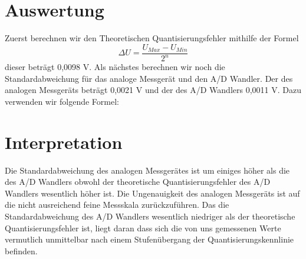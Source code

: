\documentclass[TGAI_Laborbericht.tex]{subfiles}
\begin{document}
\section{Auswertung}
\label{chap:VERSUCH_1_AUSWERTUNG}
Zuerst berechnen wir den Theoretischen Quantisierungsfehler mithilfe der Formel \[\Delta U = \frac{U_{Max}-U_{Min}}{2^{n}} \] dieser beträgt 0,0098 V. Als nächstes berechnen wir noch die Standardabweichung für das analoge Messgerät  und den A/D Wandler. Der des analogen Messgeräts beträgt 0,0021 V und der des A/D Wandlers 0,0011 V. Dazu verwenden wir folgende Formel: 

\section{Interpretation}
\label{chap:VERSUCH_1_INTERPRETATION}
Die Standardabweichung des analogen Messgerätes ist um einiges höher als die des A/D Wandlers obwohl der theoretische Quantisierungsfehler des A/D Wandlers wesentlich höher ist. Die Ungenauigkeit des analogen Messgeräts ist auf die nicht ausreichend feine Messskala zurückzuführen.
Das die Standardabweichung des A/D Wandlers wesentlich niedriger als der theoretische Quantisierungsfehler ist, liegt daran dass sich die von uns gemessenen Werte vermutlich unmittelbar nach einem Stufenübergang der Quantisierungskennlinie befinden.
\end{document}
